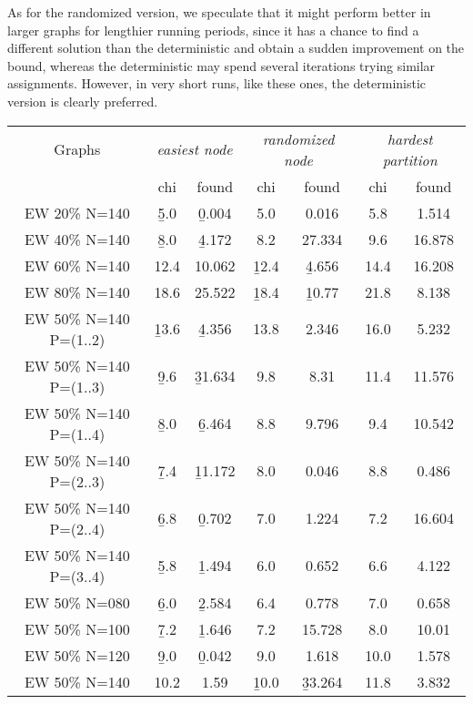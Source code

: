 As for the randomized version, we speculate that it might perform better in larger graphs for lengthier running periods, since it has a chance to find a different solution than the deterministic and obtain a sudden improvement on the bound, whereas the deterministic may spend several iterations trying similar assignments. However, in very short runs, like these ones, the deterministic version is clearly preferred.  

\begin{table}
\label{table:pdsatur:comp}
\centering

\begin{tabular}{|c|cc|cc|cc|}
\hline
\multicolumn{1}{|c|}{Graphs} & \multicolumn{2}{|c|}{\textit{easiest node}} & \multicolumn{2}{|c|}{\textit{randomized node}} & \multicolumn{2}{|c|}{\textit{hardest partition}}
\\
 & chi & found & chi & found & chi & found
\\
\hline
EW 20\% N=140 &  \b{5.0} & \b{0.004} &  5.0 & 0.016 &  5.8 & 1.514
\\
EW 40\% N=140 &  \b{8.0} & \b{4.172} &  8.2 & 27.334 &  9.6 & 16.878
\\
EW 60\% N=140 & 12.4 & 10.062 & \b{12.4} & \b{4.656} & 14.4 & 16.208
\\
EW 80\% N=140 & 18.6 & 25.522 & \b{18.4} & \b{10.77} & 21.8 & 8.138
\\
\hline
EW 50\% N=140 P=(1..2) & \b{13.6} & \b{4.356} & 13.8 & 2.346 & 16.0 & 5.232
\\
EW 50\% N=140 P=(1..3) &  \b{9.6} & \b{31.634} &  9.8 & 8.31 & 11.4 & 11.576
\\
EW 50\% N=140 P=(1..4) &  \b{8.0} & \b{6.464} &  8.8 & 9.796 &  9.4 & 10.542
\\
EW 50\% N=140 P=(2..3) &  \b{7.4} & \b{11.172} &  8.0 & 0.046 &  8.8 & 0.486
\\
EW 50\% N=140 P=(2..4) &  \b{6.8} & \b{0.702} &  7.0 & 1.224 &  7.2 & 16.604
\\
EW 50\% N=140 P=(3..4) &  \b{5.8} & \b{1.494} &  6.0 & 0.652 &  6.6 & 4.122
\\
\hline
EW 50\% N=080 &  \b{6.0} & \b{2.584} &  6.4 & 0.778 &  7.0 & 0.658
\\
EW 50\% N=100 &  \b{7.2} & \b{1.646} &  7.2 & 15.728 &  8.0 & 10.01
\\
EW 50\% N=120 &  \b{9.0} & \b{0.042} &  9.0 & 1.618 & 10.0 & 1.578
\\
EW 50\% N=140 & 10.2 & 1.59 & \b{10.0} & \b{33.264} & 11.8 & 3.832
\\

\end{tabular}
\end{table}
